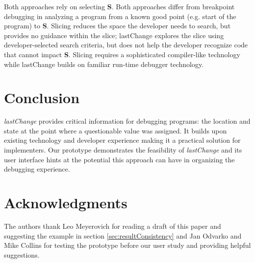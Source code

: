 \documentclass{sig-alternate}
\begin{document}
Both approaches rely on selecting {\bf S}. Both approaches differ from breakpoint debugging in analyzing a program from a known good point (e.g. start of the program) to {\bf S}.  Slicing reduces the space the developer needs to search, but provides no guidance within the slice; lastChange explores the slice using developer-selected search criteria, but does not help the developer recognize code that cannot impact {\bf S}. Slicing requires a sophisticated compiler-like technology while lastChange builds on familiar run-time debugger technology. 

 


\section{Conclusion}
\textit{lastChange} provides critical information for debugging programs: the location and state at the point where a questionable value was assigned. It builds upon existing technology and developer experience making it a practical solution for implementers. Our prototype demonstrates the feasibility of \textit{lastChange} and its user interface hints at the potential this approach can have in organizing the debugging experience. 




\section{Acknowledgments}
The authors thank Leo Meyerovich for reading a draft of this paper and suggesting the example in section \ref{sec:resultConsistency} and
Jan Odvarko and Mike Collins for testing the prototype before our user study and providing helpful suggestions.
\end{document}
